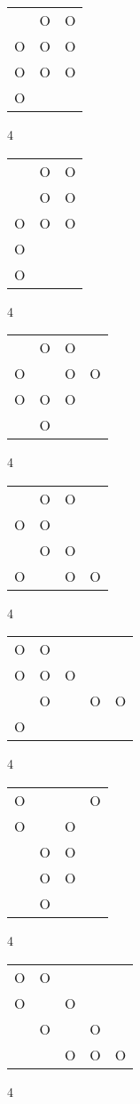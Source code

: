 \begin{tabular}{|m{0.2cm}m{0.2cm}m{0.2cm}|}\hline
 &O&O\\
O&O&O\\
O&O&O\\
O& & \\
\hline\end{tabular}4
\begin{tabular}{|m{0.2cm}m{0.2cm}m{0.2cm}|}\hline
 &O&O\\
 &O&O\\
O&O&O\\
O& & \\
O& & \\
\hline\end{tabular}4
\begin{tabular}{|m{0.2cm}m{0.2cm}m{0.2cm}m{0.2cm}|}\hline
 &O&O& \\
O& &O&O\\
O&O&O& \\
 &O& & \\
\hline\end{tabular}4
\begin{tabular}{|m{0.2cm}m{0.2cm}m{0.2cm}m{0.2cm}|}\hline
 &O&O& \\
O&O& & \\
 &O&O& \\
O& &O&O\\
\hline\end{tabular}4
\begin{tabular}{|m{0.2cm}m{0.2cm}m{0.2cm}m{0.2cm}m{0.2cm}|}\hline
O&O& & & \\
O&O&O& & \\
 &O& &O&O\\
O& & & & \\
\hline\end{tabular}4
\begin{tabular}{|m{0.2cm}m{0.2cm}m{0.2cm}m{0.2cm}|}\hline
O& & &O\\
O& &O& \\
 &O&O& \\
 &O&O& \\
 &O& & \\
\hline\end{tabular}4
\begin{tabular}{|m{0.2cm}m{0.2cm}m{0.2cm}m{0.2cm}m{0.2cm}|}\hline
O&O& & & \\
O& &O& & \\
 &O& &O& \\
 & &O&O&O\\
\hline\end{tabular}4
